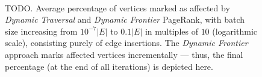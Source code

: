 \begin{figure}[!hbt]
  \centering
   \\[-2ex]
\caption{TODO. Average percentage of vertices marked as affected by \textit{Dynamic Traversal} and \textit{Dynamic Frontier} PageRank, with batch size increasing from $10^{-7} |E|$ to $0.1 |E|$ in multiples of $10$ (logarithmic scale), consisting purely of edge insertions. The \textit{Dynamic Frontier} approach marks affected vertices incrementally --- thus, the final percentage (at the end of all iterations) is depicted here.}
  \label{fig:measure-affected}
\end{figure}
